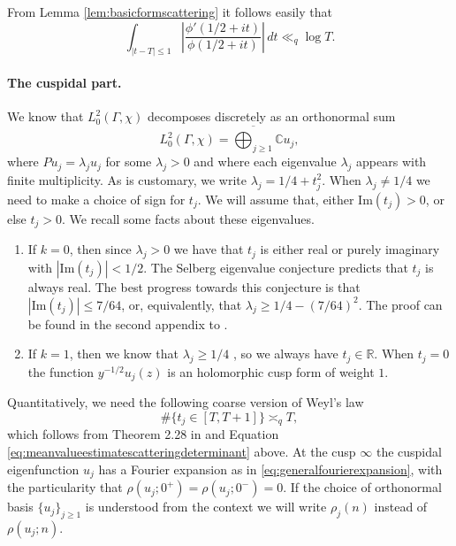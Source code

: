 \documentclass{article}
\theoremstyle{named}
\newcommand{\CC}{\mathbb{C}}
\newcommand{\R}{\mathbb{R}}
\begin{document}
From Lemma \ref{lem:basicformscattering} it follows easily that
\begin{equation}\label{eq:meanvalueestimatescatteringdeterminant}
    \int_{|t-T| \leq 1} \left|\frac{\phi'(1/2 + it)}{\phi(1/2 + it)}\right| \, dt \ll_{q} \log T.
\end{equation}

\paragraph{The cuspidal part.}
We know that $L_0^2(\Gamma, \chi)$ decomposes discretely as an orthonormal sum
\begin{equation}\label{eq:basicorthonormalbasis}
    L_0^2(\Gamma, \chi) = \overline{\bigoplus_{j\geq 1}} \CC u_j,
\end{equation}
where $P u_j = \lambda_j u_j$ for some $\lambda_j > 0$ and where each eigenvalue $\lambda_j$ appears with finite multiplicity. As is customary, we write $\lambda_j = 1/4 + t_j^2$. When $\lambda_j \neq 1/4$ we need to make a choice of sign for $t_j$. We will assume that, either $\text{Im}(t_j) > 0$, or else $t_j > 0$.
We recall some facts about these eigenvalues.
\begin{enumerate}
    \item [1)] If $k = 0$, then since $\lambda_j > 0$ we have that $t_j$ is either real or purely imaginary with $|\text{Im}(t_j)|< 1/2$. The Selberg eigenvalue conjecture predicts that $t_j$ is always real. The best progress towards this conjecture is that $|\text{Im}(t_j)| \leq 7/64$, or, equivalently, that $\lambda_j \geq 1/4 - (7/64)^2$. The proof can be found in the second appendix to \cite{kimramakrishnansarnak2003}.
    \item [2)] If $k = 1$, then we know that $\lambda_j \geq 1/4$ \cite[Equation (4.40)]{DFIsubconvexityartin}, so we always have $t_j \in \R$. When $t_j = 0$ the function $y^{-1/2}u_j(z)$ is an holomorphic cusp form of weight $1$.
\end{enumerate}
Quantitatively, we need the following coarse version of Weyl's law
\begin{equation}\label{eq:basicweyllaw}
    \#\{t_j \in [T, T + 1]\} \asymp_q  T,
\end{equation}
which follows from Theorem 2.28 in \cite{hejhal2} and Equation \eqref{eq:meanvalueestimatescatteringdeterminant} above. At the cusp $\infty$ the cuspidal eigenfunction $u_j$ has a Fourier expansion as in \eqref{eq:generalfourierexpansion}, with the particularity that $\rho(u_j; 0^+) = \rho(u_j; 0^-) = 0$. If the choice of orthonormal basis $\{u_j\}_{j\geq 1}$ is understood from the context we will write $\rho_{j}(n)$ instead of $\rho(u_j; n)$.
\end{document}
